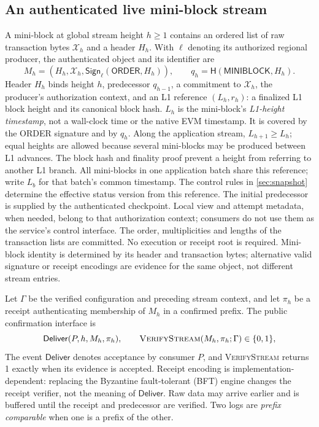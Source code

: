 \documentclass[11pt,a4paper,onecolumn]{article}
\newcommand{\Hash}{\mathsf H}
\newcommand{\Sig}{\mathsf{Sign}}
\newcommand{\Tag}[1]{\ensuremath{\mathsf{#1}}}
\newcommand{\Proc}[1]{\textnormal{\textsc{#1}}}
\begin{document}
\subsection{An authenticated live mini-block stream}\label{sec:stream}
A mini-block at global stream height $h\geq1$ contains an ordered list of
raw transaction bytes $\mathcal X_h$ and a header $H_h$. With $\ell$ denoting
its authorized regional producer, the authenticated object and its
identifier are
\[
 M_h=(H_h,\mathcal X_h,\Sig_\ell(\Tag{ORDER},H_h)),
 \qquad q_h=\Hash(\Tag{MINIBLOCK},H_h).
\]
Header $H_h$ binds height $h$, predecessor $q_{h-1}$, a commitment to
$\mathcal X_h$, the producer's authorization context, and an L1 reference
$(L_h,r_h)$: a finalized L1 block height and its canonical block hash.
$L_h$ is the mini-block's \emph{L1-height timestamp}, not a wall-clock time
or the native EVM timestamp. It is covered by the ORDER signature and by
$q_h$. Along the application stream, $L_{h+1}\geq L_h$; equal heights are
allowed because several mini-blocks may be produced between L1 advances.
The block hash and finality proof prevent a height from referring to
another L1 branch. All mini-blocks in one application batch share this
reference; write $L_b$ for that batch's common timestamp.
The control rules in \cref{sec:snapshot} determine the effective status
version from this reference. The initial predecessor is supplied by
the authenticated checkpoint. Local view and attempt metadata, when needed,
belong to that authorization context; consumers do not use them as the
service's control interface. The order, multiplicities and lengths of the
transaction lists are committed. No execution or receipt root is required.
Mini-block identity is determined by its header and transaction bytes;
alternative valid signature or receipt encodings are evidence for the same
object, not different stream entries.

Let $\Gamma$ be the verified configuration and preceding stream context,
and let $\pi_h$ be a receipt authenticating membership of $M_h$ in a
confirmed prefix. The public confirmation interface is
\[
 \Tag{Deliver}(P,h,M_h,\pi_h),\qquad
 \Proc{VerifyStream}(M_h,\pi_h;\Gamma)\in\{0,1\},
\]
The event \Tag{Deliver} denotes acceptance by consumer $P$, and
\Proc{VerifyStream} returns 1 exactly when its evidence is accepted.
Receipt encoding is implementation-dependent: replacing the Byzantine
fault-tolerant (BFT) engine changes
the receipt verifier, not the meaning of \Tag{Deliver}. Raw data may arrive
earlier and is buffered until the receipt and predecessor are verified.
Two logs are \emph{prefix comparable} when one is a prefix of the other.
\end{document}
